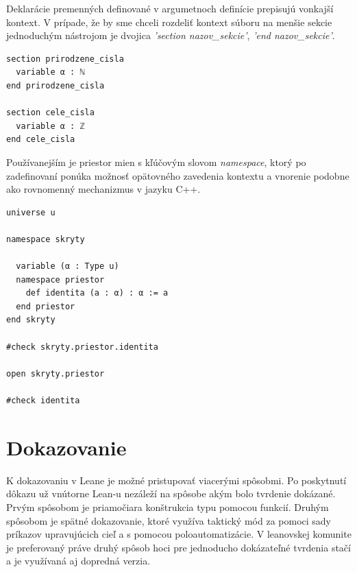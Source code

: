 \documentclass[a4paper,10pt,oneside]{report}%
\begin{document}
    Deklarácie premenných definované v argumetnoch definície prepisujú vonkajší kontext.
    V prípade, že by sme chceli rozdeliť kontext súboru na menšie sekcie jednoduchým
nástrojom je dvojica \newline \emph{'section nazov\_sekcie'}, \emph{'end nazov\_sekcie'}.
\begin{lstlisting}
section prirodzene_cisla
  variable α : ℕ
end prirodzene_cisla

section cele_cisla
  variable α : ℤ
end cele_cisla
\end{lstlisting}
    Používanejším je priestor mien s kľúčovým slovom \emph{namespace}, ktorý po 
zadefinovaní ponúka možnosť opätovného zavedenia kontextu a vnorenie podobne ako 
rovnomenný mechanizmus v jazyku C++.
\begin{lstlisting}
universe u

namespace skryty

  variable (α : Type u)
  namespace priestor
    def identita (a : α) : α := a
  end priestor
end skryty

#check skryty.priestor.identita

open skryty.priestor

#check identita
\end{lstlisting}
\section{Dokazovanie}

    K dokazovaniu v Leane je možné pristupovať viacerými spôsobmi.
    Po poskytnutí dôkazu už vnútorne Lean-u nezáleží na spôsobe akým bolo tvrdenie
dokázané.
    Prvým spôsobom je priamočiara konštrukcia typu pomocou funkcií.
    Druhým spôsobom je spätné dokazovanie, ktoré využíva taktický mód za pomoci
sady príkazov upravujúcich cieľ a s pomocou poloautomatizácie.
    V leanovskej komunite je preferovaný práve druhý spôsob hoci pre jednoducho
dokázateľné tvrdenia stačí a je využívaná aj dopredná verzia.
\end{document}
